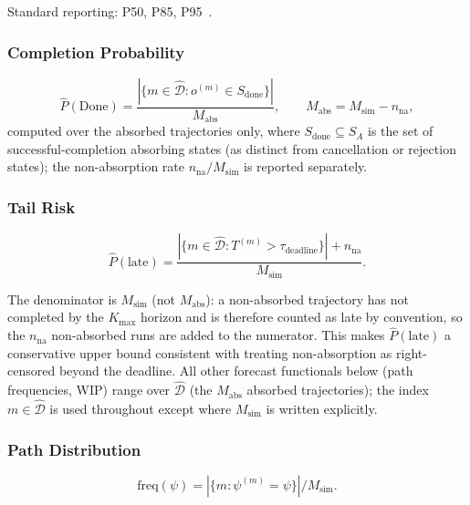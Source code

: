 Standard reporting: P50, P85, P95~\cite{vacanti2015}.

\subsubsection{Completion Probability}

\begin{equation}
\label{eq:completion-prob}
\hat{P}(\text{Done}) =
   \frac{|\{m \in \hat{\mathcal{D}} : o^{(m)} \in S_{\text{done}}\}|}
        {M_{\text{abs}}},
\qquad M_{\text{abs}} = M_{\text{sim}} - n_{\text{na}},
\end{equation}
computed over the absorbed trajectories only, where $S_{\text{done}}
\subseteq S_A$ is the set of successful-completion absorbing states (as
distinct from cancellation or rejection states); the non-absorption rate
$n_{\text{na}}/M_{\text{sim}}$ is reported separately.

\subsubsection{Tail Risk}

\begin{definition}
\label{def:tail-risk}
\begin{equation}
\label{eq:tail-risk}
\hat{P}(\text{late}) =
   \frac{|\{m \in \hat{\mathcal{D}} : T^{(m)} > \tau_{\text{deadline}}\}|
         + n_{\text{na}}}{M_{\text{sim}}}.
\end{equation}
\end{definition}
The denominator is $M_{\text{sim}}$ (not $M_{\text{abs}}$): a non-absorbed
trajectory has not completed by the $K_{\max}$ horizon and is therefore
counted as late by convention, so the $n_{\text{na}}$ non-absorbed runs are
added to the numerator. This makes $\hat{P}(\text{late})$ a conservative
upper bound consistent with treating non-absorption as right-censored beyond
the deadline. All other forecast functionals below (path frequencies, WIP)
range over $\hat{\mathcal{D}}$ (the $M_{\text{abs}}$ absorbed trajectories);
the index $m \in \hat{\mathcal{D}}$ is used throughout except where
$M_{\text{sim}}$ is written explicitly.

\subsubsection{Path Distribution}

\begin{equation}
\label{eq:path-freq}
\text{freq}(\psi) = |\{m : \psi^{(m)} = \psi\}| / M_{\text{sim}}.
\end{equation}

